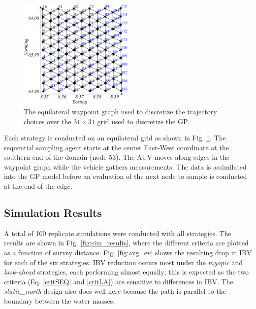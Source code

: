 \documentclass[aoas]{imsart}
\begin{document}
\begin{figure}[h!]
\centering
\includegraphics[width=0.50\textwidth]{Figures/sim/wp_graph_paper.pdf}
\caption{The equilateral waypoint graph used to discretize the
  trajectory choices over the $31\times31$ grid used to discretize the GP.}
\label{fig:wp_graph}
\end{figure}

Each strategy is conducted on an equilateral grid as shown in
Fig. \ref{fig:wp_graph}. The sequential sampling agent starts at the
center East-West coordinate at the southern end of the domain (node
53). The AUV moves along edges in the waypoint graph while the vehicle
gathers measurements. The data is assimilated into the GP model before
an evaluation of the next node to sample is conducted at the end of
the edge.

\subsection{Simulation Results}

A total of 100 replicate simulations were conducted with all
strategies. The results are shown in Fig. \ref{fig:sim_results}, where
the different criteria are plotted as a function of survey
distance. Fig. \ref{fig:avg_ev} shows the resulting drop in IBV for
each of the six strategies. IBV reduction occurs most under the
\textit{myopic} and \textit{look-ahead} strategies, each performing
almost equally; this is expected as the two criteria
(Eq. \eqref{critSEQ} and \eqref{critLA}) are sensitive to differences
in IBV. The \textit{static\_north} design also does well here because
the path is parallel to the boundary between the water masses.
\end{document}
